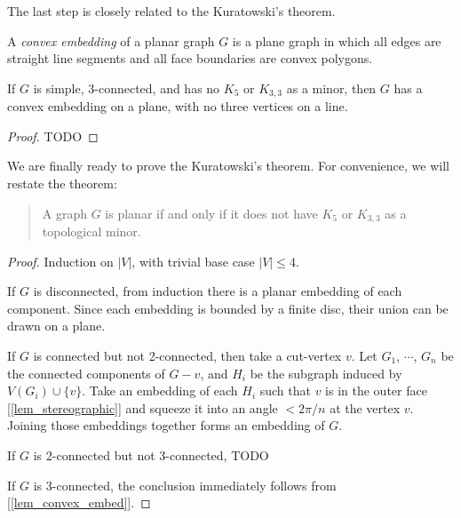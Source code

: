         The last step is closely related to the Kuratowski's theorem.
    
        \begin{defn} \label{def_convex_embed}
            A \emph{convex embedding} of a planar graph $G$ is a plane graph in which all edges are straight line segments and all face boundaries are convex polygons.
        \end{defn}
        
        \begin{lemma} \label{lem_convex_embed}
            If $G$ is simple, 3-connected, and has no $K_5$ or $K_{3,3}$ as a minor, then $G$ has a convex embedding on a plane, with no three vertices on a line.
        \end{lemma}
        
        \begin{proof}
            TODO
        \end{proof}
        
        We are finally ready to prove the Kuratowski's theorem. For convenience, we will restate the theorem:
        
        \begin{quote}
            A graph $G$ is planar if and only if it does not have $K_5$ or $K_{3,3}$ as a topological minor.
        \end{quote}
        
        \begin{proof}
            Induction on $|V|$, with trivial base case $|V| \leq 4$.
            
            If $G$ is disconnected, from induction there is a planar embedding of each component. Since each embedding is bounded by a finite disc, their union can be drawn on a plane.
            
            If $G$ is connected but not 2-connected, then take a cut-vertex $v$. Let $G_1$, $\cdots$, $G_n$ be the connected components of $G-v$, and $H_i$ be the subgraph induced by $V(G_i) \cup \{v\}$. Take an embedding of each $H_i$ such that $v$ is in the outer face [\ref{lem_stereographic}] and squeeze it into an angle $< 2\pi / n$ at the vertex $v$. Joining those embeddings together forms an embedding of $G$.
            
            If $G$ is 2-connected but not 3-connected, TODO
            
            If $G$ is 3-connected, the conclusion immediately follows from [\ref{lem_convex_embed}].
        \end{proof}
    
